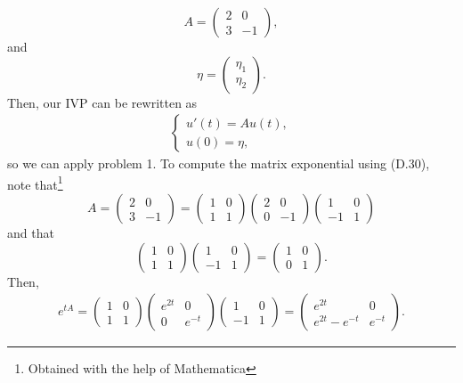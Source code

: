 \documentclass{article}
\begin{document}
\[
A=\begin{pmatrix}
	2 &0\\
	3 &-1
\end{pmatrix},
\]
and 
\[
\eta=\begin{pmatrix}
	\eta_1\\ \eta_2
\end{pmatrix}.
\]
Then, our IVP can be rewritten as
  \begin{align*}
	\begin{cases}
		u'(t) = A u(t),\\
		u(0) = \eta,
	\end{cases}
\end{align*}
so we can apply problem 1. To compute the matrix exponential using (D.30), note that\footnote{Obtained with the help of Mathematica}
\[
A=\begin{pmatrix}
	2 &0\\
	3 &-1
\end{pmatrix}=\begin{pmatrix}
1 &0\\
1 &1
\end{pmatrix}\begin{pmatrix}
2 &0\\
0 &-1
\end{pmatrix}\begin{pmatrix}
1 &0\\
-1 &1
\end{pmatrix}
\]
and that 
\[
\begin{pmatrix}
	1 &0\\
	1 &1
\end{pmatrix}\begin{pmatrix}
	1 &0\\
	-1 &1
\end{pmatrix}=\begin{pmatrix}
1 &0\\
0 &1
\end{pmatrix}.
\]
Then,
\begin{align*}
e^{tA}=\begin{pmatrix}
	1 &0\\
	1 &1
\end{pmatrix}\begin{pmatrix}
	e^{2t} &0\\
	0 &e^{-t}
\end{pmatrix}\begin{pmatrix}
	1 &0\\
	-1 &1
\end{pmatrix}=\begin{pmatrix}
e^{2t} &0\\
e^{2t}-e^{-t} &e^{-t}
\end{pmatrix}.
\end{align*}
\end{document}
